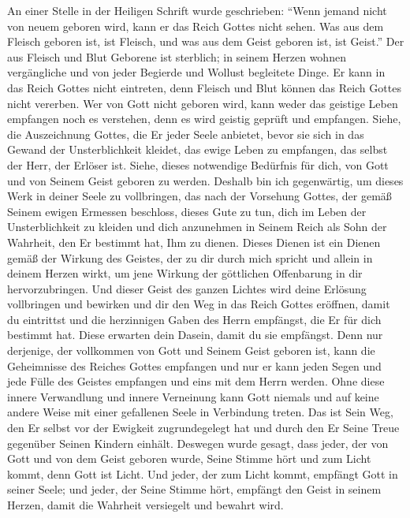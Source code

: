  An einer Stelle in der Heiligen Schrift wurde geschrieben: "`Wenn jemand nicht von neuem geboren wird, kann er das Reich Gottes nicht sehen. Was aus dem Fleisch geboren ist, ist Fleisch, und was aus dem Geist geboren ist, ist Geist."' Der aus Fleisch und Blut Geborene ist sterblich; in seinem Herzen wohnen vergängliche und von jeder Begierde und Wollust begleitete Dinge. Er kann in das Reich Gottes nicht eintreten, denn Fleisch und Blut können das Reich Gottes nicht vererben. Wer von Gott nicht geboren wird, kann weder das geistige Leben empfangen noch es verstehen, denn es wird geistig geprüft und empfangen.
 Siehe, die Auszeichnung Gottes, die Er jeder Seele anbietet, bevor sie sich in das Gewand der Unsterblichkeit kleidet, das ewige Leben zu empfangen, das selbst der Herr, der Erlöser ist. Siehe, dieses notwendige Bedürfnis für dich, von Gott und von Seinem Geist geboren zu werden. Deshalb bin ich gegenwärtig, um dieses Werk in deiner Seele zu vollbringen, das nach der Vorsehung Gottes, der gemäß Seinem ewigen Ermessen beschloss, dieses Gute zu tun, dich im Leben der Unsterblichkeit zu kleiden und dich anzunehmen in Seinem Reich als Sohn der Wahrheit, den Er bestimmt hat, Ihm zu dienen. Dieses Dienen ist ein Dienen gemäß der Wirkung des Geistes, der zu dir durch mich spricht und allein in deinem Herzen wirkt, um jene Wirkung der göttlichen Offenbarung in dir hervorzubringen. Und dieser Geist des ganzen Lichtes wird deine Erlösung vollbringen und bewirken und dir den Weg in das Reich Gottes eröffnen, damit du eintrittst und die herzinnigen Gaben des Herrn empfängst, die Er für dich bestimmt hat. Diese erwarten dein Dasein, damit du sie empfängst. Denn nur derjenige, der vollkommen von Gott und Seinem Geist geboren ist, kann die Geheimnisse des Reiches Gottes empfangen und nur er kann jeden Segen und jede Fülle des Geistes empfangen und eins mit dem Herrn werden. Ohne diese innere Verwandlung und innere Verneinung kann Gott niemals und auf keine andere Weise mit einer gefallenen Seele in Verbindung treten. Das ist Sein Weg, den Er selbst vor der Ewigkeit zugrundegelegt hat und durch den Er Seine Treue gegenüber Seinen Kindern einhält. Deswegen wurde gesagt, dass jeder, der von Gott und von dem Geist geboren wurde, Seine Stimme hört und zum Licht kommt, denn Gott ist Licht. Und jeder, der zum Licht kommt, empfängt Gott in seiner Seele; und jeder, der Seine Stimme hört, empfängt den Geist in seinem Herzen, damit die Wahrheit versiegelt und bewahrt wird. 
 
